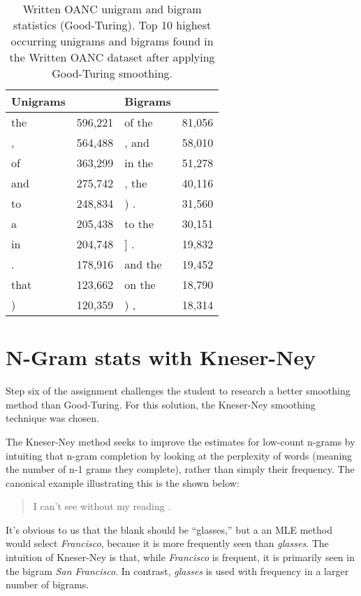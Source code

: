 \documentclass[11pt]{article}
\begin{document}
\begin{table}[h]
\begin{center}
\begin{tabular}{|lr|lr|}
\hline \bf Unigrams & & \bf Bigrams & \\ \hline
the & 596,221     & of the & 81,056 \\
, & 564,488        & , and & 58,010 \\
of & 363,299         & in the & 51,278 \\
and & 275,742     & , the & 40,116 \\
to & 248,834      & ) . & 31,560 \\
a & 205,438        & to the & 30,151 \\
in & 204,748       & ] . & 19,832 \\
. & 178,916       & and the & 19,452 \\
that & 123,662    & on the & 18,790 \\
) & 120,359        & ) , & 18,314 \\
\hline
\end{tabular}
\end{center}
\caption{\label{tokenStats} Written OANC unigram and bigram statistics (Good-Turing).
Top 10 highest occurring unigrams and bigrams found in the Written OANC dataset after
applying Good-Turing smoothing.}
\end{table}

\section{N-Gram stats with Kneser-Ney}
Step six of the assignment challenges the student to research a better smoothing method
than Good-Turing.  For this solution, the Kneser-Ney smoothing technique was chosen.

The Kneser-Ney method seeks to improve the estimates for low-count n-grams by intuiting
that n-gram completion by looking at the perplexity of words (meaning the number of n-1 grams
they complete), rather than simply their frequency. The canonical example illustrating this
is the shown below:

\begin{quote}
I can't see without my reading \underline{\hspace{1cm}}.
\end{quote}

It's obvious to us that the blank should be ``glasses,'' but a an MLE method would select
{\em Francisco}, because it is more frequently seen than {\em glasses}.  The intuition of
Kneser-Ney is that, while {\em Francisco} is frequent, it is primarily seen in the bigram
{\em San Francisco}.  In contrast, {\em glasses} is used with frequency in a larger number
of bigrams.
\end{document}

